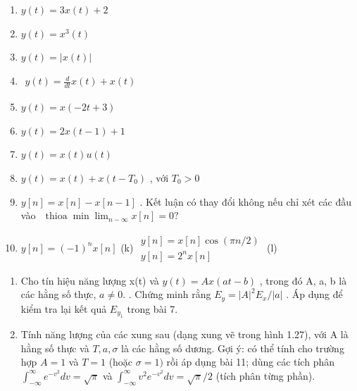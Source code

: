 \documentclass[
  10
]{article}
\begin{document}
\begin{enumerate}
\def\labelenumi{(\alph{enumi})}
\item
  \(y ( t ) = 3 x ( t ) + 2\)
\item
  \(y ( t ) = x ^ { 3 } ( t )\)
\item
  \(y ( t ) = | x ( t ) |\)
\item
  \(\begin{array} { r } { y ( t ) = \frac { d } { d t } x ( t ) + x ( t ) } \end{array}\)
\item
  \(y ( t ) = x ( - 2 t + 3 )\)
\item
  \(y ( t ) = 2 x ( t - 1 ) + 1\)
\item
  \(y ( t ) = x ( t ) u ( t )\)
\item
  \(y ( t ) = x ( t ) + x ( t - T _ { 0 } )\) , với \(T _ { 0 } > 0\)
\item
  \(y [ n ] = x [ n ] - x [ n - 1 ]\) . Kết luận có thay đổi không nếu
  chỉ xét các đầu vào
  \(\begin{array} { r } { \operatorname { t h i o a } \operatorname* { m i n } \operatorname* { l i m } _ { n  - \infty } x [ n ] = 0 ? } \end{array}\)
\item
  \(y [ n ] = ( - 1 ) ^ { n } x [ n ]\) (k)
  \(\begin{array} { l } { { y [ n ] = x [ n ] \cos ( \pi n / 2 ) } } \\ { { y [ n ] = 2 ^ { n } x [ n ] } } \end{array}\)
  (l)
\end{enumerate}

\begin{enumerate}
\def\labelenumi{\arabic{enumi}.}
\setcounter{enumi}{10}
\item
  Cho tín hiệu năng lượng x(t) và \(y ( t ) = A x ( a t - b )\) , trong
  đó A, a, b là các hằng số thực, \(a \neq 0 .\) . Chứng minh rằng
  \(E _ { y } = | A | ^ { 2 } E _ { x } / | a |\) . Áp dụng để kiểm tra
  lại kết quả \(E _ { y _ { 1 } }\) trong bài 7.
\item
  Tính năng lượng của các xung sau (dạng xung vẽ trong hình 1.27), với A
  là hằng số thực và \(T , a , \sigma\) là các hằng số dương. Gợi ý: có
  thể tính cho trường hợp \(A = 1\) và \(T = 1\) (hoặc \(\sigma = 1 )\)
  rồi áp dụng bài 11; dùng các tích phân
  \(\textstyle \int _ { - \infty } ^ { \infty } e ^ { - v ^ { 2 } } d v = { \sqrt { \pi } }\)
  và
  \(\textstyle \int _ { - \infty } ^ { \infty } v ^ { 2 } e ^ { - v ^ { 2 } } d v = { \sqrt { \pi } } / 2\)
  (tích phân từng phần).
\end{enumerate}
\end{document}
